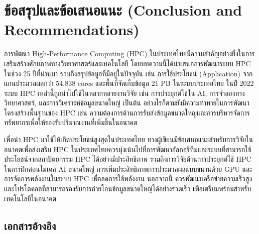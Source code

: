 \documentclass[a4paper,12pt]{extarticle}
\begin{document}
\newpage

\section{ข้อสรุปและข้อเสนอแนะ (Conclusion and Recommendations)}
การพัฒนา High-Performance Computing (HPC) ในประเทศไทยมีความสำคัญอย่างยิ่งในการเสริมสร้างศักยภาพทางวิทยาศาสตร์และเทคโนโลยี โดยบทความนี้ได้นำเสนอการพัฒนาระบบ HPC ในช่วง 25 ปีที่ผ่านมา รวมถึงสรุปข้อมูลที่มีอยู่ในปัจจุบัน เช่น การใช้ประโยชน์ (Application) จากแกนประมวลผลกว่า 54,838 cores และพื้นที่จัดเก็บข้อมูล 21 PB ในระบบประเทศไทย ในปี 2022 ระบบ HPC เหล่านี้ถูกนำไปใช้ในหลากหลายงานวิจัย เช่น การประยุกต์ใช้ใน AI, การจำลองทางวิทยาศาสตร์, และการวิเคราะห์ข้อมูลขนาดใหญ่ เป็นต้น อย่างไรก็ตามยังมีความท้าทายในการพัฒนาโครงสร้างพื้นฐานของ HPC เช่น ความต้องการด้านการรับส่งข้อมูลขนาดใหญ่และการบริหารจัดการทรัพยากรเพื่อให้รองรับปริมาณงานที่เพิ่มขึ้นในอนาคต

เพื่อนำ HPC มาใช้ให้เกิดประโยชน์สูงสุดในประเทศไทย ทางผู้เขียนมีข้อเสนอแนะสำหรับการวิจัยในอนาคตเพื่อส่งเสริม HPC ในประเทศไทยควรมุ่งเน้นไปที่การพัฒนาอัลกอริทึมและระบบที่สามารถใช้ประโยชน์จากสถาปัตยกรรม HPC ได้อย่างมีประสิทธิภาพ รวมถึงการวิจัยด้านการประยุกต์ใช้ HPC ในการฝึกสอนโมเดล AI ขนาดใหญ่ การเพิ่มประสิทธิภาพการประมวลผลแบบขนานด้วย GPU และการจัดการพลังงานในระบบ HPC เพื่อลดการใช้พลังงาน นอกจากนี้ ควรพัฒนาเครือข่ายความเร็วสูงและโปรโตคอลที่สามารถรองรับการถ่ายโอนข้อมูลขนาดใหญ่ได้อย่างรวดเร็ว เพื่อเตรียมพร้อมสำหรับเทคโนโลยีในอนาคต

\newpage

\begin{center}
\section*{เอกสารอ้างอิง}
\end{center}
\end{document}
